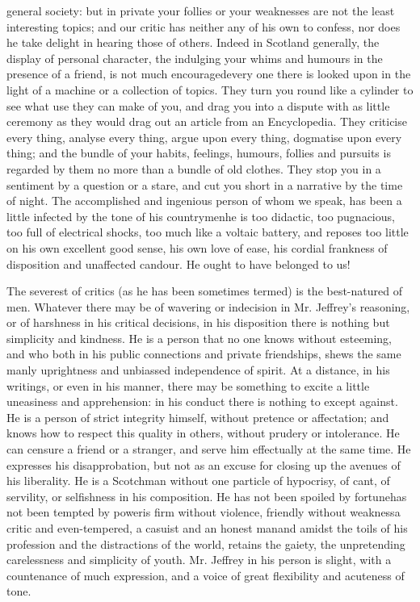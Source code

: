 general society: but in private your follies or your weaknesses
are not the least interesting topics; and our critic has neither
any of his own to confess, nor does he take delight in hearing
those of others. Indeed in Scotland generally, the display of
personal character, the indulging your whims and humours in the
presence of a friend, is not much encouraged\textemdash every one
there is looked upon in the light of a machine or a collection of
topics. They turn you round like a cylinder to see what use they
can make of you, and drag you into a dispute with as little
ceremony as they would drag out an article from an
Encyclopedia. They criticise every thing, analyse every thing,
argue upon every thing, dogmatise upon every thing; and the bundle
of your habits, feelings, humours, follies and pursuits is
regarded by them no more than a bundle of old clothes. They stop
you in a sentiment by a question or a stare, and cut you short in
a narrative by the time of night. The accomplished and ingenious
person of whom we speak, has been a little infected by the tone of
his countrymen\textemdash he is too didactic, too pugnacious, too
full of electrical shocks, too much like a voltaic battery, and
reposes too little on his own excellent good sense, his own love
of ease, his cordial frankness of disposition and unaffected
candour. He ought to have belonged to us!

The severest of critics (as he has been sometimes termed) is the
best-natured of men. Whatever there may be of wavering or
indecision in Mr. Jeffrey's reasoning, or of harshness in his
critical decisions, in his disposition there is nothing but
simplicity and kindness. He is a person that no one knows without
esteeming, and who both in his public connections and private
friendships, shews the same manly uprightness and unbiassed
independence of spirit. At a distance, in his writings, or even in
his manner, there may be something to excite a little uneasiness
and apprehension: in his conduct there is nothing to except
against.  He is a person of strict integrity himself, without
pretence or affectation; and knows how to respect this quality in
others, without prudery or intolerance. He can censure a friend or
a stranger, and serve him effectually at the same time. He
expresses his disapprobation, but not as an excuse for closing up
the avenues of his liberality. He is a Scotchman without one
particle of hypocrisy, of cant, of servility, or selfishness in
his composition. He has not been spoiled by fortune\textemdash has
not been tempted by power\textemdash is firm without violence,
friendly without weakness\textemdash a critic and even-tempered, a
casuist and an honest man\textemdash and amidst the toils of his
profession and the distractions of the world, retains the gaiety,
the unpretending carelessness and simplicity of youth. Mr. Jeffrey
in his person is slight, with a countenance of much expression,
and a voice of great flexibility and acuteness of tone.
